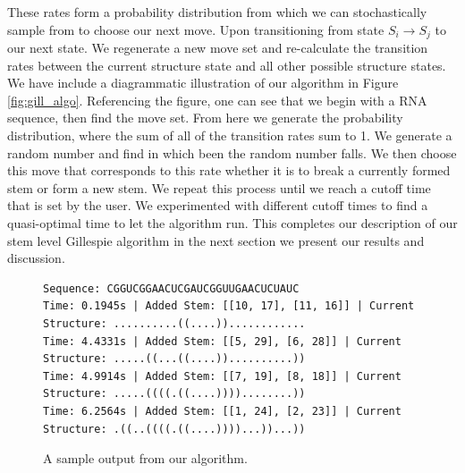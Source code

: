 \documentclass[11pt]{article}
\begin{document}
\begin{multicols}{2}
These rates form a probability distribution from which we can stochastically sample from to choose our next move. Upon transitioning from state $S_{i} \rightarrow S_{j}$ to our next state. We regenerate a new move set and re-calculate the transition rates between the current structure state and all other possible structure states. We have include a diagrammatic illustration of our algorithm in Figure \ref{fig:gill_algo}. Referencing the figure, one can see that we begin with a RNA sequence, then find the move set. From here we generate the probability distribution, where the sum of all of the transition rates sum to 1. We generate a random number and find in which been the random number falls. We then choose this move that corresponds to this rate whether it is to break a currently formed stem or form a new stem. We repeat this process until we reach a cutoff time that is set by the user. We experimented with different cutoff times to find a quasi-optimal time to let the algorithm run.
This completes our description of our stem level Gillespie algorithm in the next section we present our results and discussion.
\end{multicols}


\begin{figure}[H]
\begin{small}
\begin{verbatim}
Sequence: CGGUCGGAACUCGAUCGGUUGAACUCUAUC
Time: 0.1945s | Added Stem: [[10, 17], [11, 16]] | Current Structure: ..........((....))............
Time: 4.4331s | Added Stem: [[5, 29], [6, 28]] | Current Structure: .....((...((....))..........))
Time: 4.9914s | Added Stem: [[7, 19], [8, 18]] | Current Structure: .....((((.((....))))........))
Time: 6.2564s | Added Stem: [[1, 24], [2, 23]] | Current Structure: .((..((((.((....))))...))...))
\end{verbatim}
\end{small}
\caption{A sample output from our algorithm.}
\end{figure}
\end{document}
